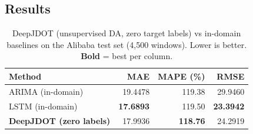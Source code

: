 \documentclass[12pt,a4paper]{article}
\begin{document}
\subsection{Results}

\begin{table}[H]
\centering
\small
\caption{DeepJDOT (unsupervised DA, zero target labels) vs in-domain baselines on
         the Alibaba test set (4,500 windows).  Lower is better.  \textbf{Bold} = best per column.}
\label{tab:deepjdot}
\begin{tabular}{@{}lrrr@{}}
\toprule
\textbf{Method} & \textbf{MAE} & \textbf{MAPE (\%)} & \textbf{RMSE} \\
\midrule
ARIMA (in-domain)   & 19.4478 & 119.38 & 29.9460 \\
LSTM (in-domain)    & \textbf{17.6893} & 119.50 & \textbf{23.3942} \\
\midrule
\textcolor{djdotcolor}{\textbf{DeepJDOT (zero labels)}} &
  17.9936 & \textbf{118.76} & 24.2919 \\
\bottomrule
\end{tabular}
\end{table}
\end{document}
